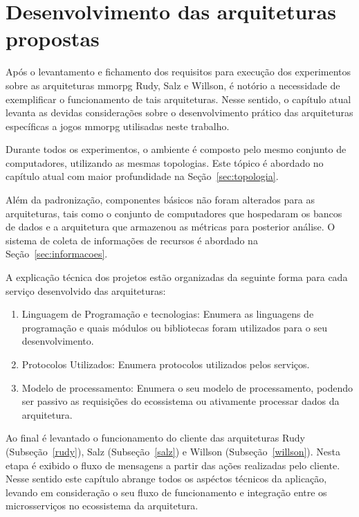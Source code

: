 
\chapter{Desenvolvimento das arquiteturas propostas}
\label{cap5}



Após o levantamento e fichamento dos requisitos para execução dos experimentos sobre as arquiteturas \ac{mmorpg} Rudy, Salz e Willson, é notório a necessidade de exemplificar o funcionamento de tais arquiteturas.
%
Nesse sentido, o capítulo atual levanta as devidas considerações sobre o desenvolvimento prático das arquiteturas específicas a jogos \ac{mmorpg} utilisadas neste trabalho.


Durante todos os experimentos, o ambiente é composto pelo mesmo conjunto de computadores, utilizando as mesmas topologias.
%
Este tópico é abordado no capítulo atual com maior profundidade na Seção~\ref{sec:topologia}.

Além da padronização, componentes básicos não foram alterados para as arquiteturas, tais como o conjunto de computadores que hospedaram os bancos de dados e a arquitetura que armazenou as métricas para posterior análise.
%
O sistema de coleta de informações de recursos é abordado na Seção~\ref{sec:informacoes}.

A explicação técnica dos projetos estão organizadas da seguinte forma para cada serviço desenvolvido das arquiteturas:


\begin{enumerate}
    \item Linguagem de Programação e tecnologias: Enumera as linguagens de programação e quais módulos ou bibliotecas foram utilizados para o seu desenvolvimento.
    \item Protocolos Utilizados: Enumera protocolos utilizados pelos serviços. 
    \item Modelo de processamento: Enumera o seu modelo de processamento, podendo ser passivo as requisições do ecossistema ou ativamente processar dados da arquitetura.
\end{enumerate}

Ao final é levantado o funcionamento do cliente das arquiteturas Rudy (Subseção~\ref{rudy}), Salz (Subseção~\ref{salz}) e Willson (Subseção~\ref{willson}).
%
Nesta etapa é exibido o fluxo de mensagens a partir das ações realizadas pelo cliente.
%
Nesse sentido este capítulo abrange todos os aspéctos técnicos da aplicação, levando em consideração o seu fluxo de funcionamento e integração entre os microsserviços no ecossistema da arquitetura.


